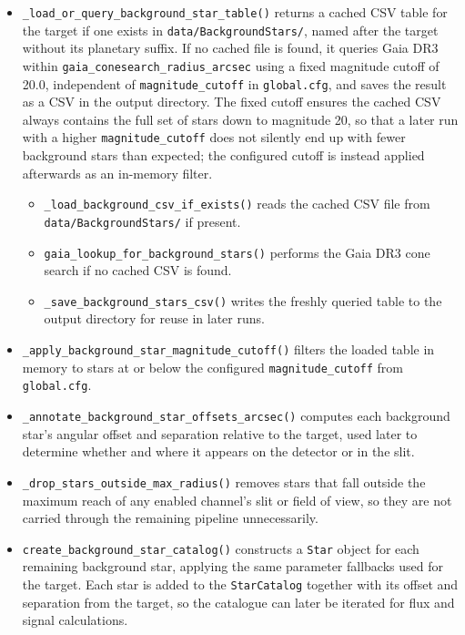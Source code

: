 \begin{itemize}
    \item \texttt{\_load\_or\_query\_background\_star\_table()} returns a cached CSV table for the target if one exists in \texttt{data/BackgroundStars/}, named after the target without its planetary suffix. If no cached file is found, it queries Gaia DR3 within \texttt{gaia\_conesearch\_radius\_arcsec} using a fixed magnitude cutoff of 20.0, independent of \texttt{magnitude\_cutoff} in \texttt{global.cfg}, and saves the result as a CSV in the output directory. The fixed cutoff ensures the cached CSV always contains the full set of stars down to magnitude 20, so that a later run with a higher \texttt{magnitude\_cutoff} does not silently end up with fewer background stars than expected; the configured cutoff is instead applied afterwards as an in-memory filter.          \begin{itemize}
              \item \texttt{\_load\_background\_csv\_if\_exists()} reads the cached CSV file from \texttt{data/BackgroundStars/} if present.
              \item \texttt{gaia\_lookup\_for\_background\_stars()} performs the Gaia DR3 cone search if no cached CSV is found.
              \item \texttt{\_save\_background\_stars\_csv()} writes the freshly queried table to the output directory for reuse in later runs.
          \end{itemize}

    \item \texttt{\_apply\_background\_star\_magnitude\_cutoff()} filters the loaded table in memory to stars at or below the configured \texttt{magnitude\_cutoff} from \texttt{global.cfg}.

    \item \texttt{\_annotate\_background\_star\_offsets\_arcsec()} computes each background star's angular offset and separation relative to the target, used later to determine whether and where it appears on the detector or in the slit.

    \item \texttt{\_drop\_stars\_outside\_max\_radius()} removes stars that fall outside the maximum reach of any enabled channel's slit or field of view, so they are not carried through the remaining pipeline unnecessarily.

    \item \texttt{create\_background\_star\_catalog()} constructs a \texttt{Star} object for each remaining background star, applying the same parameter fallbacks used for the target. Each star is added to the \texttt{StarCatalog} together with its offset and separation from the target, so the catalogue can later be iterated for flux and signal calculations.
\end{itemize}

